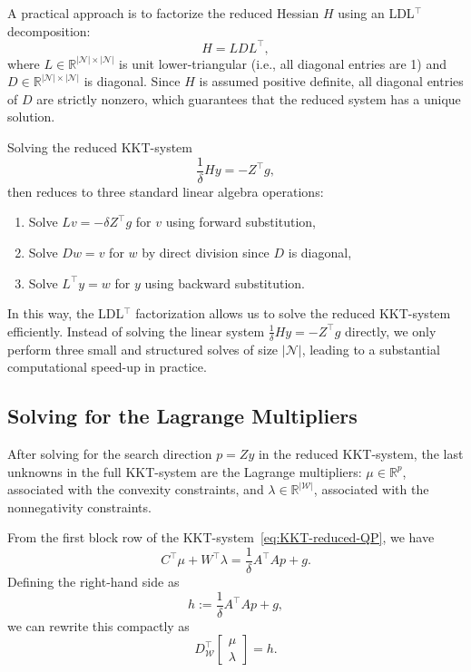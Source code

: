 \documentclass{book}
\theoremstyle{definition}
\numberwithin{algorithm_}{chapter}
\begin{document}
{\newpage

A practical approach is to factorize the reduced Hessian \(H\) using an LDL\(^\top\) decomposition:
\[
H = L D L^\top,
\]
where \(L \in \mathbb{R}^{|\mathcal{N}| \times |\mathcal{N}|}\) is unit lower-triangular (i.e., all diagonal entries are 1) and \(D \in \mathbb{R}^{|\mathcal{N}| \times |\mathcal{N}|}\) is diagonal.  
Since \(H\) is assumed positive definite, all diagonal entries of \(D\) are strictly nonzero, which guarantees that the reduced system has a unique solution.  

Solving the reduced KKT-system
\begin{equation} \label{eq:reduced_KKTsystem}
\frac{1}{\delta} H y = - Z^\top g,
\end{equation}
then reduces to three standard linear algebra operations:
\begin{enumerate}
    \item Solve \(L v = -\delta Z^\top g\) for \(v\) using forward substitution,
    \item Solve \(D w = v\) for \(w\) by direct division since \(D\) is diagonal,
    \item Solve \(L^\top y = w\) for \(y\) using backward substitution.
\end{enumerate}

In this way, the LDL$^\top$ factorization allows us to solve the reduced KKT-system efficiently. Instead of solving the linear system 
\(\frac{1}{\delta} H y = - Z^\top g\) directly, we only perform three small and structured solves of size \(|\mathcal{N}|\), leading to a substantial computational speed-up in practice.


\subsection{Solving for the Lagrange Multipliers}

After solving for the search direction \(p = Z y\) in the reduced KKT-system, the last unknowns in the full KKT-system are the Lagrange multipliers: 
\(\mu \in \mathbb{R}^p\), associated with the convexity constraints, and 
\(\lambda \in \mathbb{R}^{|\mathcal{W}|}\), associated with the nonnegativity constraints.  

\bigskip

From the first block row of the KKT-system~\eqref{eq:KKT-reduced-QP}, we have
\begin{equation}
C^\top \mu + W^\top \lambda = \frac{1}{\delta} A^\top A p + g.
\end{equation}
Defining the right-hand side as 
\begin{equation} \label{eq:definition_h}
h := \frac{1}{\delta} A^\top A p + g,
\end{equation}
we can rewrite this compactly as
\begin{equation} \label{eq:lagrange_system}
D_\mathcal{W}^\top 
\begin{bmatrix} \mu \\ \lambda \end{bmatrix} = h.
\end{equation}

}
\end{document}

